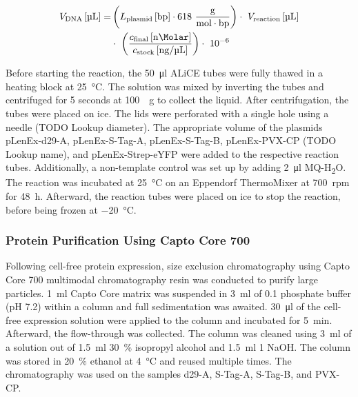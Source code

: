 \begin{align}
    \label{eq:alice_calc}
    \begin{split}
V_{\text{DNA}}\, [\si{\micro\liter}] =&\left( L_{\text{plasmid}}\, [\text{bp}] \cdot 618\ \frac{\text{g}}{\text{mol} \cdot \text{bp}} \right) \cdot\ V_{\text{reaction}}\, [\si{\micro\liter}] \\
& \cdot\ \left( \frac{c_{\text{final}}\, [\si{\nano\Molar}]}{c_{\text{stock}}\, [\si{\nano\gram}/\si{\micro\liter}]} \right) \cdot\ 10^{-6}
    \end{split}
\end{align}

Before starting the reaction, the \SI{50}{\micro\litre} ALiCE tubes were fully thawed in a heating block at \SI{25}{\degreeCelsius}. The solution was mixed by inverting the tubes and centrifuged for 5 seconds at \SI{100}{\times g} to collect the liquid. After centrifugation, the tubes were placed on ice. The lids were perforated with a single hole using a needle (TODO Lookup diameter). The appropriate volume of the plasmids pLenEx-d29-A, pLenEx-S-Tag-A, pLenEx-S-Tag-B, pLenEx-PVX-CP (TODO Lookup name), and pLenEx-Strep-eYFP were added to the respective reaction tubes. Additionally, a non-template control was set up by adding \SI{2}{\micro\litre} MQ-H\textsubscript{2}O. The reaction was incubated at \SI{25}{\degreeCelsius} on an Eppendorf ThermoMixer at \SI{700}{rpm} for \SI{48}{\hour}. Afterward, the reaction tubes were placed on ice to stop the reaction, before being frozen at \SI{-20}{\degreeCelsius}. 

\subsubsection{Protein Purification Using Capto Core 700}
Following cell-free protein expression, size exclusion chromatography using Capto\textsuperscript{\texttrademark} Core 700 multimodal chromatography resin was conducted to purify large particles. \SI{1}{\milli\litre} Capto\textsuperscript{\texttrademark} Core matrix was suspended in \SI{3}{\milli\litre} of \SI{0.1}{\Molar} phosphate buffer (pH 7.2) within a column and full sedimentation was awaited. \SI{30}{\micro\litre} of the cell-free expression solution were applied to the column and incubated for \SI{5}{\minute}. Afterward, the flow-through was collected. The column was cleaned using \SI{3}{\milli\litre} of a solution out of \SI{1.5}{\milli\litre} \SI{30}{\percent} isopropyl alcohol and \SI{1.5}{\milli\litre} \SI{1}{\Molar} NaOH. The column was stored in \SI{20}{\percent} ethanol at \SI{4}{\degreeCelsius} and reused multiple times. The chromatography was used on the samples d29-A, S-Tag-A, S-Tag-B, and PVX-CP. 

